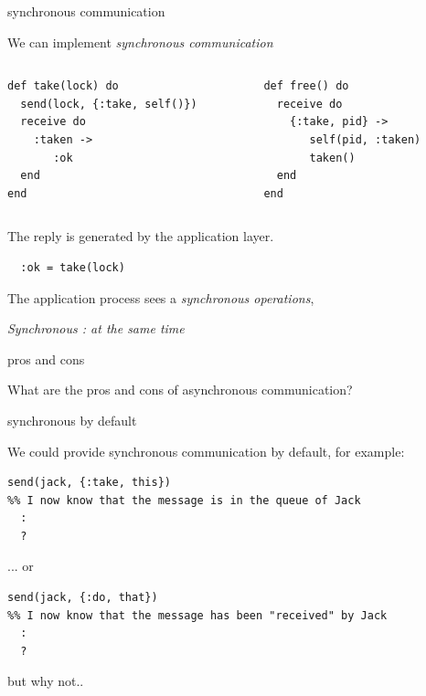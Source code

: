 \begin{frame}[fragile]{synchronous communication}

We can implement {\em synchronous communication}
\pause\vspace{20pt}

\begin{columns}
 \begin{column}{0.5\linewidth}
  \begin{verbatim}
def take(lock) do
  send(lock, {:take, self()})
  receive do
    :taken ->
       :ok
  end 
end
  \end{verbatim}
  \pause
 \end{column}
 \begin{column}{0.5\linewidth}
  \begin{verbatim}
def free() do
  receive do
    {:take, pid} ->
       self(pid, :taken)
       taken()
  end
end
  \end{verbatim}
 \end{column}
\end{columns}
\pause\vspace{10pt}
        
The reply is generated by the application layer.
\pause\vspace{5pt}

\begin{verbatim}
  :ok = take(lock)
\end{verbatim}

The application process sees a {\em synchronous operations},
\pause\vspace{5pt}

{\em Synchronous : at the same time}
\end{frame}

\begin{frame}{pros and cons}

What are the pros and cons of asynchronous communication?

\end{frame}

\begin{frame}[fragile]{synchronous by default}

We could provide synchronous communication by default, for example:
\pause\vspace{10pt}
\begin{verbatim}
send(jack, {:take, this})
%% I now know that the message is in the queue of Jack
  :
  ?
\end{verbatim}

\pause 
\vspace{10pt}... or\vspace{10pt}
\begin{verbatim}
send(jack, {:do, that})
%% I now know that the message has been "received" by Jack
  :
  ?
\end{verbatim}
\pause 
\vspace{10pt}but why not..\vspace{10pt}
\end{frame}

